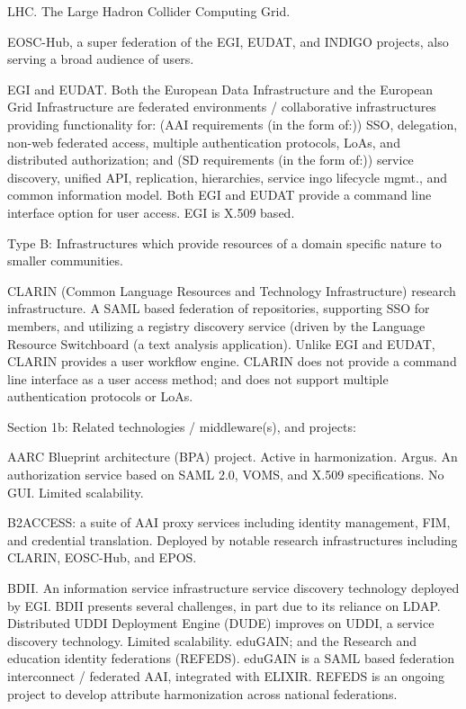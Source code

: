 LHC. The Large Hadron Collider Computing Grid.

EOSC-Hub, a super federation of the EGI, EUDAT, and INDIGO projects,
also serving a broad audience of users.

EGI and EUDAT. Both the European Data Infrastructure and the European
Grid Infrastructure are federated environments / collaborative
infrastructures providing functionality for: (AAI requirements (in the
    form of:)) SSO, delegation, non-web federated access, multiple
authentication protocols, LoAs, and distributed authorization; and (SD
  requirements (in the form of:)) service discovery, unified API,
replication, hierarchies, service ingo lifecycle mgmt., and common
information model. Both EGI and EUDAT provide a command line interface
option for user access. EGI is X.509 based.

Type B: Infrastructures which provide resources of a domain specific
nature to smaller communities.

CLARIN (Common Language Resources and Technology Infrastructure)
research infrastructure. A SAML based federation of repositories,
supporting SSO for members, and utilizing a registry discovery service
(driven by the Language Resource Switchboard (a text analysis
    application). Unlike EGI and EUDAT, CLARIN provides a user
  workflow engine. CLARIN does not provide a command line interface as
  a user access method; and does not support multiple authentication
  protocols or LoAs.

Section 1b: Related technologies / middleware(s), and projects: 

AARC Blueprint architecture (BPA) project. Active in harmonization.
Argus. An authorization service based on SAML 2.0, VOMS, and X.509
specifications. No GUI. Limited scalability.

B2ACCESS: a suite of AAI proxy services including identity management,
FIM, and credential translation. Deployed by notable research
infrastructures including CLARIN, EOSC-Hub, and EPOS.

BDII. An information service infrastructure service discovery
technology deployed by EGI. BDII presents several challenges, in part
due to its reliance on LDAP.  Distributed UDDI Deployment Engine
(DUDE) improves on UDDI, a service discovery technology. Limited
scalability.  eduGAIN; and the Research and education identity
federations (REFEDS). eduGAIN is a SAML based federation interconnect
/ federated AAI, integrated with ELIXIR. REFEDS is an ongoing project
to develop attribute harmonization across national federations.

